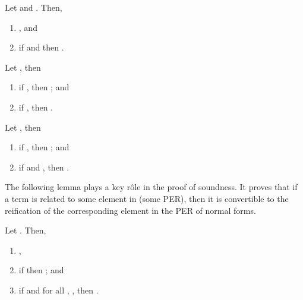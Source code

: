 \documentclass{LMCS}
\newcommand{\LONGVERSION}[1]{}
\begin{document}
\begin{lem}
  \label{lem:logrelEqTy} Let  
  and .  Then,
  \begin{enumerate}[\em(a)]
  \item , and
  \item if  and  
  then .
  \end{enumerate}
\end{lem}
\LONGVERSION{
\begin{proof}By induction on . See \ref{prf:logrelEqTy}.
\end{proof}
}

\begin{lem}[Monotonicity]
  \label{lem:logrelMon}
  Let , then
  \begin{enumerate}[\em(a)]
  \item if , then
    ; and
  \item if , then
    .
  \end{enumerate}
\end{lem}
\LONGVERSION{
  \begin{proof}By induction on . See \ref{prf:logrelMon}.
  \end{proof}
}

\begin{lem}
  \label{lem:logrelEqD}
  Let , then
  \begin{enumerate}[\em(a)]
  \item if , then ;
    and
  \item if  and 
    , then .
  \end{enumerate}
\end{lem}
\LONGVERSION{
\begin{proof}By induction on . See \ref{prf:logrelEqD}.
\end{proof}
}

The following lemma plays a key r\^ole in the proof of soundness. It
proves that if a term is related to some element in (some PER), then
it is convertible to the reification of the corresponding element in
the PER of normal forms.


\begin{lem}\label{lem:judgeq}
  Let .  Then, 
  \begin{enumerate}[\em(a)]
  \item ,
  \item if  then 
     ; and
  \item if  and for all ,
    ,
    then .
  \end{enumerate}
\end{lem}
\LONGVERSION{
\begin{proof}By induction on . See \ref{prf:judgeq}.
\end{proof}
}
\end{document}
